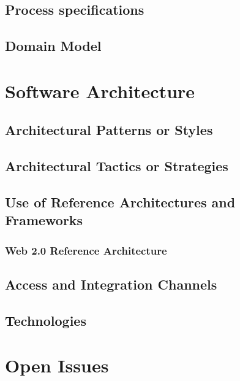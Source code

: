 \documentclass[a4paper,12pt]{article}
\begin{document}
\subsection{Process specifications}

\subsection{Domain Model}

\newpage
\section{Software Architecture}

\subsection{Architectural Patterns or Styles}
	
\subsection{Architectural Tactics or Strategies}

\subsection{Use of Reference Architectures and Frameworks}

\subsubsection{Web 2.0 Reference Architecture}

\subsection{Access and Integration Channels}

\subsection{Technologies}

\newpage
\section{Open Issues}
\end{document}
